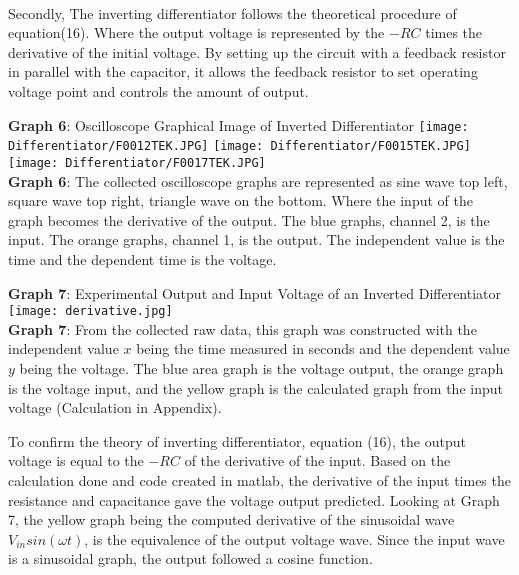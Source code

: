 \documentclass[11pt]{article}
\begin{document}
\\Secondly, The inverting differentiator follows the theoretical procedure of equation(16). Where the output voltage is represented by the $-RC$ times the derivative of the initial voltage. By setting up the circuit with a feedback resistor in parallel with the capacitor, it allows the feedback resistor to set operating voltage point and controls the amount of output. 
\begin{center}
    \textbf{Graph 6}: Oscilloscope Graphical Image of Inverted Differentiator
    \texttt{[image: Differentiator/F0012TEK.JPG]}
    \texttt{[image: Differentiator/F0015TEK.JPG]}
    \texttt{[image: Differentiator/F0017TEK.JPG]}\\\textbf{Graph 6}: The collected oscilloscope graphs are represented as sine wave top left, square wave top right, triangle wave on the bottom. Where the input of the graph becomes the derivative of the output. The blue graphs, channel 2, is the input. The orange graphs, channel 1, is the output. The independent value is the time and the dependent time is the voltage. 
\end{center}
\newpage
\begin{center}
    \textbf{Graph 7}: Experimental Output and Input Voltage of an Inverted Differentiator
    \texttt{[image: derivative.jpg]}\\\textbf{Graph 7}: From the collected raw data, this graph was constructed with the independent value $x$ being the time measured in seconds and the dependent value $y$ being the voltage. The blue area graph is the voltage output, the orange graph is the voltage input, and the yellow graph is the calculated graph from the input voltage (Calculation in Appendix). 
\end{center}
To confirm the theory of inverting differentiator, equation (16), the output voltage is equal to the $-RC$ of the derivative of the input. Based on the calculation done and code created in matlab, the derivative of the input times the resistance and capacitance gave the voltage output predicted. Looking at Graph 7, the yellow graph being the computed derivative of the sinusoidal wave $V_{in}sin(\omega t)$, is the equivalence of the output voltage wave. Since the input wave is a sinusoidal graph, the output followed a cosine function.\\
\end{document}
